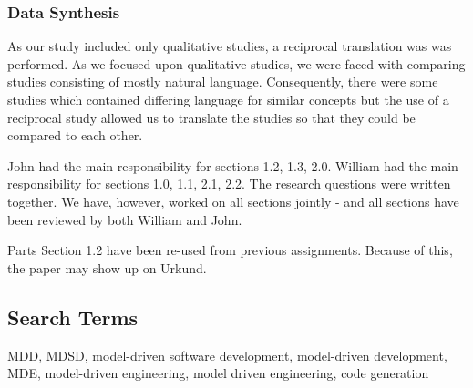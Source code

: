 \documentclass[10pt,twocolumn]{article}
\begin{document}
\subsubsection{Data Synthesis}

As our study included only qualitative studies, a reciprocal translation was was performed. As we focused upon qualitative studies, we were faced with comparing studies consisting of mostly natural language. Consequently, there were some studies which contained differing language for similar concepts but the use of a reciprocal study allowed us to translate the studies so that they could be compared to each other.  





John had the main responsibility for sections 1.2, 1.3, 2.0. William had the main responsibility for sections 1.0, 1.1, 2.1, 2.2. The research questions were written together. We have, however, worked on all sections jointly - and all sections have been reviewed by both William and John. 

Parts Section 1.2 have been re-used from previous assignments. Because of this, the paper may show up on Urkund. 



\begin{appendices}
\section{Search Terms}
MDD, MDSD, model-driven software development, model-driven development, MDE, model-driven engineering, model driven engineering, code generation
\end{appendices}
\end{document}
